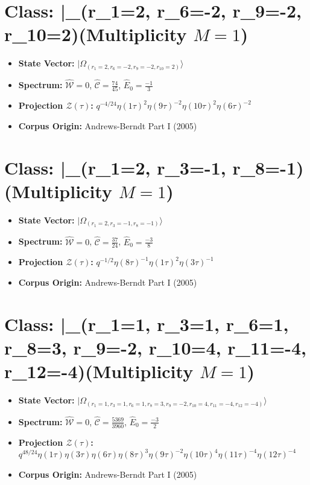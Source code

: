 \documentclass[11pt,twoside,openright]{book}
\begin{document}
\section*{Class: |\Omega_{(r_{1}=2, r_{6}=-2, r_{9}=-2, r_{10}=2)}\rangle (Multiplicity $M=1$)}
\begin{itemize}
  \item \textbf{State Vector:} $|\Omega_{(r_{1}=2, r_{6}=-2, r_{9}=-2, r_{10}=2)}\rangle$
  \item \textbf{Spectrum:} $\hat{\mathcal{W}} = 0$, $\hat{\mathcal{C}} = \frac{74}{45}$, $\hat{E}_0 = \frac{-1}{3}$
  \item \textbf{Projection $\mathcal{Z}(\tau)$:} $q^{-4/24} \eta(1\tau)^{2} \eta(9\tau)^{-2} \eta(10\tau)^{2} \eta(6\tau)^{-2}$
  \item \textbf{Corpus Origin:} Andrews-Berndt Part I (2005)
\end{itemize}

\section*{Class: |\Omega_{(r_{1}=2, r_{3}=-1, r_{8}=-1)}\rangle (Multiplicity $M=1$)}
\begin{itemize}
  \item \textbf{State Vector:} $|\Omega_{(r_{1}=2, r_{3}=-1, r_{8}=-1)}\rangle$
  \item \textbf{Spectrum:} $\hat{\mathcal{W}} = 0$, $\hat{\mathcal{C}} = \frac{37}{24}$, $\hat{E}_0 = \frac{-3}{8}$
  \item \textbf{Projection $\mathcal{Z}(\tau)$:} $q^{-1/2} \eta(8\tau)^{-1} \eta(1\tau)^{2} \eta(3\tau)^{-1}$
  \item \textbf{Corpus Origin:} Andrews-Berndt Part I (2005)
\end{itemize}

\section*{Class: |\Omega_{(r_{1}=1, r_{3}=1, r_{6}=1, r_{8}=3, r_{9}=-2, r_{10}=4, r_{11}=-4, r_{12}=-4)}\rangle (Multiplicity $M=1$)}
\begin{itemize}
  \item \textbf{State Vector:} $|\Omega_{(r_{1}=1, r_{3}=1, r_{6}=1, r_{8}=3, r_{9}=-2, r_{10}=4, r_{11}=-4, r_{12}=-4)}\rangle$
  \item \textbf{Spectrum:} $\hat{\mathcal{W}} = 0$, $\hat{\mathcal{C}} = \frac{5369}{3960}$, $\hat{E}_0 = \frac{-3}{2}$
  \item \textbf{Projection $\mathcal{Z}(\tau)$:} $q^{48/24} \eta(1\tau) \eta(3\tau) \eta(6\tau) \eta(8\tau)^{3} \eta(9\tau)^{-2} \eta(10\tau)^{4} \eta(11\tau)^{-4} \eta(12\tau)^{-4}$
  \item \textbf{Corpus Origin:} Andrews-Berndt Part I (2005)
\end{itemize}
\end{document}

